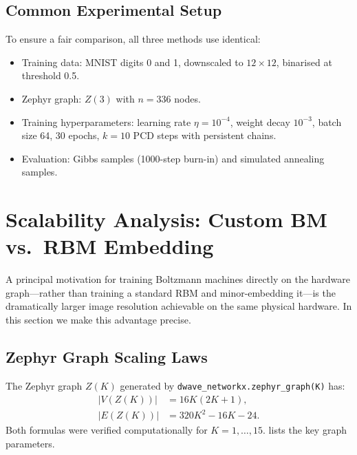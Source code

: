 \documentclass[11pt,a4paper]{article}
\begin{document}
\subsection{Common Experimental Setup}

To ensure a fair comparison, all three methods use identical:
\begin{itemize}[nosep]
  \item Training data: MNIST digits 0 and 1, downscaled to $12\times 12$, binarised at threshold 0.5.
  \item Zephyr graph: $Z(3)$ with $n=336$ nodes.
  \item Training hyperparameters: learning rate $\eta = 10^{-4}$, weight decay $10^{-3}$, batch size 64, 30 epochs, $k=10$ PCD steps with persistent chains.
  \item Evaluation: Gibbs samples (1000-step burn-in) and simulated annealing samples.
\end{itemize}


\section{Scalability Analysis: Custom BM vs.\ RBM Embedding}\label{sec:scalability}

A principal motivation for training Boltzmann machines directly on the hardware graph---rather than training a standard RBM and minor-embedding it---is the dramatically larger image resolution achievable on the same physical hardware.  In this section we make this advantage precise.

\subsection{Zephyr Graph Scaling Laws}\label{sec:zephyrscaling}

The Zephyr graph $Z(K)$ generated by \texttt{dwave\_networkx.zephyr\_graph(K)} has:
\begin{align}
  |V(Z(K))| &= 16K(2K+1), \label{eq:nK}\\
  |E(Z(K))| &= 320K^2 - 16K - 24. \label{eq:mK}
\end{align}
Both formulas were verified computationally for $K=1,\ldots,15$.   lists the key graph parameters.
\end{document}
